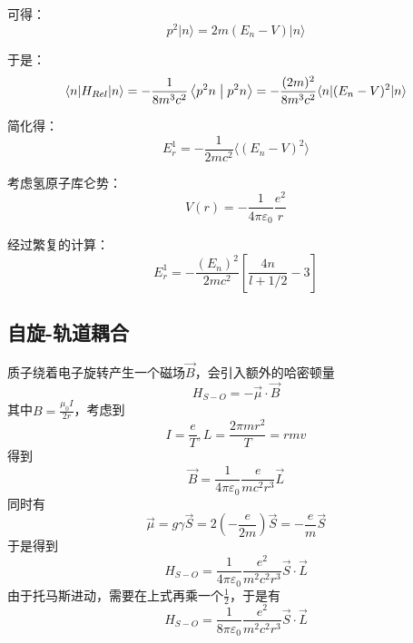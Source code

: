 可得：
\[
p^{2} | n \rangle = 2m(E_{n} - V) | n \rangle
\]

于是：
\[
\langle n | H_{Rel} | n \rangle  =  - \frac{1}{{8{m^3}{c^2}}}\left\langle {{{p^2}n}}
\mathrel{\left | {\vphantom {{{p^2}n} {{p^2}n}}}
	\right. \kern-\nulldelimiterspace}
{{{p^2}n}} \right\rangle = -\frac{(2m)^{2}}{8m^{3}c^{2}} \langle n | (E_{n} - V)^{2} | n \rangle
\]

简化得：
\[
E_{r}^{1} = -\frac{1}{2mc^{2}} \langle (E_{n} - V)^{2} \rangle
\]

考虑氢原子库仑势：
\[
V(r) = -\frac{1}{4\pi\varepsilon_{0}}\frac{e^{2}}{r}
\]

经过繁复的计算：
\[
E_{r}^{1} = -\frac{(E_{n})^{2}}{2mc^{2}} \left[ \frac{4n}{l + 1/2} - 3 \right]
\]


\subsection{自旋-轨道耦合}
质子绕着电子旋转产生一个磁场$\vec B$，会引入额外的哈密顿量
\[{H_{S - O}} =  - \vec \mu  \cdot \vec B\]
其中$\displaystyle B = \frac{{{\mu _0}I}}{{2r}}$，考虑到
\[I = \frac{e}{T},L = \frac{{2\pi m{r^2}}}{T} = rmv\]
得到
\[\vec B = \frac{1}{{4\pi {\varepsilon _0}}}\frac{e}{{m{c^2}{r^3}}}\vec L\]
同时有
\[\vec \mu  = g\gamma \vec S = 2\left( { - \frac{e}{{2m}}} \right)\vec S =  - \frac{e}{m}\vec S\]
于是得到
\[{H_{S - O}} = \frac{1}{{4\pi {\varepsilon _0}}}\frac{{{e^2}}}{{{m^2}{c^2}{r^3}}}\vec S \cdot \vec L\]
由于托马斯进动，需要在上式再乘一个$\displaystyle \frac{1}{2}$，于是有
\[{H_{S - O}} = \frac{1}{{8\pi {\varepsilon _0}}}\frac{{{e^2}}}{{{m^2}{c^2}{r^3}}}\vec S \cdot \vec L\]

